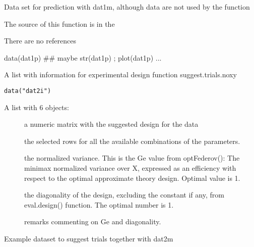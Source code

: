 \documentclass[letterpaper]{book}
\begin{document}
%
\begin{Details}\relax
Data set for prediction with dat1m, although data are not used by the function
\end{Details}
%
\begin{Source}\relax
The source of this function is in the
\end{Source}
%
\begin{References}\relax
There are no references
\end{References}
%
\begin{Examples}
\begin{ExampleCode}
data(dat1p)
## maybe str(dat1p) ; plot(dat1p) ...
\end{ExampleCode}
\end{Examples}
%
\begin{Description}\relax
A list with information for experimental design function suggest.trials.noxy
\end{Description}
%
\begin{Usage}
\begin{verbatim}
data("dat2i")
\end{verbatim}
\end{Usage}
%
\begin{Format}
A list with 6 objects:
\begin{description}

\item[] a numeric matrix with the suggested design for the data
\item[] the selected rows for all the available combinations of the parameters.
\item[] the normalized variance. This is the Ge value from optFederov(): The minimax normalized variance over X, expressed as an efficiency with respect to the optimal approximate theory design. Optimal value is 1.
\item[] the diagonality of the design, excluding the constant if any, from eval.design() function. The optimal number is 1.
\item[] remarks commenting on Ge and diagonality.

\end{description}

\end{Format}
%
\begin{Details}\relax
Example dataset to suggest trials together with dat2m
\end{Details}
\end{document}
